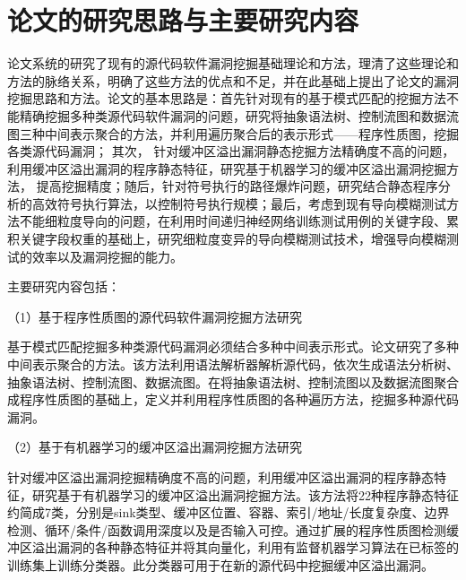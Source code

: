 \section{论文的研究思路与主要研究内容}
%
论文系统的研究了现有的源代码软件漏洞挖掘基础理论和方法，理清了这些理论和方法的脉络关系，明确了这些方法的优点和不足，并在此基础上提出了论文的漏洞挖掘思路和方法。论文的基本思路是：首先针对现有的基于模式匹配的挖掘方法不能精确挖掘多种类源代码软件漏洞的问题，研究将抽象语法树、控制流图和数据流图三种中间表示聚合的方法，并利用遍历聚合后的表示形式——程序性质图，挖掘各类源代码漏洞；
其次，
针对缓冲区溢出漏洞静态挖掘方法精确度不高的问题，利用缓冲区溢出漏洞的程序静态特征，研究基于机器学习的缓冲区溢出漏洞挖掘方法，
提高挖掘精度；随后，针对符号执行的路径爆炸问题，研究结合静态程序分析的高效符号执行算法，以控制符号执行规模；最后，考虑到现有导向模糊测试方法不能细粒度导向的问题，在利用时间递归神经网络训练测试用例的关键字段、累积关键字段权重的基础上，研究细粒度变异的导向模糊测试技术，增强导向模糊测试的效率以及漏洞挖掘的能力。

主要研究内容包括：

（1）基于程序性质图的源代码软件漏洞挖掘方法研究

基于模式匹配挖掘多种类源代码漏洞必须结合多种中间表示形式。论文研究了多种中间表示聚合的方法。该方法利用语法解析器解析源代码，依次生成语法分析树、抽象语法树、控制流图、数据流图。在将抽象语法树、控制流图以及数据流图聚合成程序性质图的基础上，定义并利用程序性质图的各种遍历方法，挖掘多种源代码漏洞。

（2）基于有机器学习的缓冲区溢出漏洞挖掘方法研究

针对缓冲区溢出漏洞挖掘精确度不高的问题，利用缓冲区溢出漏洞的程序静态特征，研究基于有机器学习的缓冲区溢出漏洞挖掘方法。该方法将22种程序静态特征约简成7类，分别是sink类型、缓冲区位置、容器、索引/地址/长度复杂度、边界检测、循环/条件/函数调用深度以及是否输入可控。通过扩展的程序性质图检测缓冲区溢出漏洞的各种静态特征并将其向量化，利用有监督机器学习算法在已标签的训练集上训练分类器。此分类器可用于在新的源代码中挖掘缓冲区溢出漏洞。

